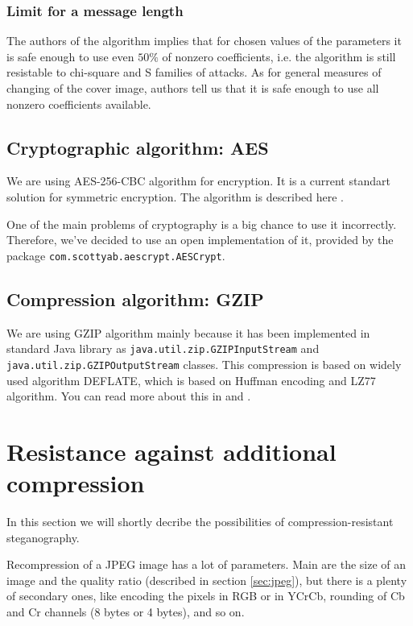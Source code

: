 \subsubsection{Limit for a message length}
The authors of the algorithm implies that for chosen values of the parameters
it is safe enough to use even $50\%$ of nonzero coefficients, i.e. the algorithm
is still resistable to chi-square and S families of attacks. As for general measures
of changing of the cover image, authors tell us that it is safe enough to use all
nonzero coefficients available.

\subsection{Cryptographic algorithm: AES}

We are using AES-256-CBC algorithm for encryption. It is a current standart
solution for symmetric encryption. The algorithm is described here \cite{standard2001announcing}.

One of the main problems of cryptography is a big chance to use it incorrectly.
Therefore, we've decided to use an open implementation of it, provided by the package
\texttt{com.scottyab.aescrypt.AESCrypt}. 


\subsection{Compression algorithm: GZIP}
We are using GZIP algorithm mainly because it has been implemented in standard
Java library as \texttt{java.util.zip.GZIPInputStream} and 
\texttt{java.util.zip.GZIPOutputStream} classes. This compression
is based on widely used algorithm DEFLATE, which is based on Huffman encoding and LZ77 algorithm.
You can read more about this in \cite{deutsch1996deflate} and \cite{deutsch1996gzip}.

\section{Resistance against additional compression}
\label{sec:addcomp}

In this section we will shortly decribe the possibilities of compression-resistant
steganography.

Recompression of a JPEG image has a lot of parameters. Main are the size of an image
and the quality ratio (described in section \ref{sec:jpeg}), but there is a plenty of
secondary ones, like encoding the pixels in RGB or in YCrCb, rounding of Cb and Cr channels
(8 bytes or 4 bytes), and so on.

